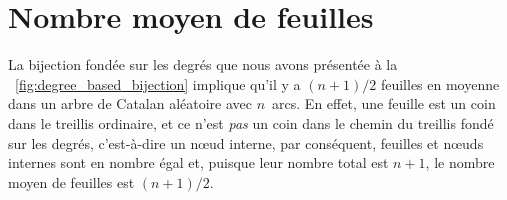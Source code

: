 

\section{Nombre moyen de feuilles}

La bijection fondée sur les degrés que nous avons présentée à la
\fig~\vref{fig:degree_based_bijection} implique qu'il y a \((n+1)/2\)
feuilles en moyenne dans un arbre de Catalan aléatoire avec
\(n\)~arcs. En effet, une feuille est un coin dans le treillis
ordinaire, et ce n'est \emph{pas} un coin dans le chemin du treillis
fondé sur les degrés, c'est-à-dire un nœud interne, par conséquent,
feuilles et nœuds internes sont en nombre égal et, puisque leur nombre
total est \(n+1\), le nombre moyen de feuilles est \((n+1)/2\).

